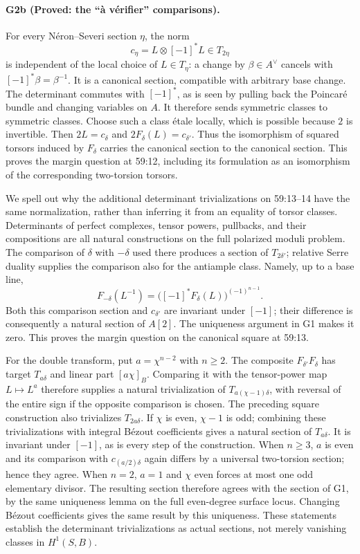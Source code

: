 \paragraph{G2b (Proved: the ``à vérifier'' comparisons).}
For every Néron--Severi section $\eta$, the norm
\[
 c_\eta=L\otimes[-1]^*L\in T_{2\eta}
\]
is independent of the local choice of $L\in T_\eta$: a change by
$\beta\in A^\vee$ cancels with $[-1]^*\beta=\beta^{-1}$.
It is a canonical section, compatible with arbitrary base change.
The determinant commutes with $[-1]^*$, as is seen by pulling back
the Poincaré bundle and changing variables on $A$.  It therefore
sends symmetric classes to symmetric classes.  Choose such a class
étale locally, which is possible because $2$ is invertible.  Then
$2L=c_\delta$ and $2F_\delta(L)=c_{\delta'}$.  Thus the isomorphism
of squared torsors induced by $F_\delta$ carries the canonical
section to the canonical section.  This proves the margin question
at 59:12, including its formulation as an isomorphism of the
corresponding two-torsion torsors.

We spell out why the additional determinant trivializations on
59:13--14 have the same normalization, rather than inferring it from
an equality of torsor classes.  Determinants of perfect complexes,
tensor powers, pullbacks, and their compositions are all natural
constructions on the full polarized moduli problem.  The comparison
of $\delta$ with $-\delta$ used there produces a section of
$T_{2\delta'}$; relative Serre duality supplies the comparison also
for the antiample class.  Namely, up to a base line,
\[
 F_{-\delta}(L^{-1})
       =\bigl([-1]^*F_\delta(L)\bigr)^{(-1)^{n-1}}.
\]
Both this comparison section and $c_{\delta'}$ are invariant under
$[-1]$; their difference is consequently a natural section of
$A[2]$.  The uniqueness argument in G1 makes it zero.  This proves
the margin question on the canonical square at 59:13.

For the double transform, put $a=\chi^{n-2}$ with $n\geq2$.
The composite $F_{\delta'}F_\delta$ has target $T_{a\delta}$ and
linear part $[a\chi]_B$.  Comparing it with the tensor-power map
$L\mapsto L^a$ therefore supplies a natural trivialization of
$T_{a(\chi-1)\delta}$, with reversal of the entire sign if the
opposite comparison is chosen.  The preceding square construction
also trivializes $T_{2a\delta}$.  If $\chi$ is even, $\chi-1$ is odd;
combining these trivializations with integral Bézout coefficients
gives a natural section of $T_{a\delta}$.  It is invariant under
$[-1]$, as is every step of the construction.  When $n\geq3$, $a$
is even and its comparison with $c_{(a/2)\delta}$ again differs by
a universal two-torsion section; hence they agree.  When $n=2$,
$a=1$ and $\chi$ even forces at most one odd elementary divisor.
The resulting section therefore agrees with the section of G1,
by the same uniqueness lemma on the full even-degree surface locus.
Changing Bézout coefficients gives the same result by this
uniqueness.  These statements establish the determinant
trivializations as actual sections, not merely vanishing classes
in $H^1(S,B)$.

